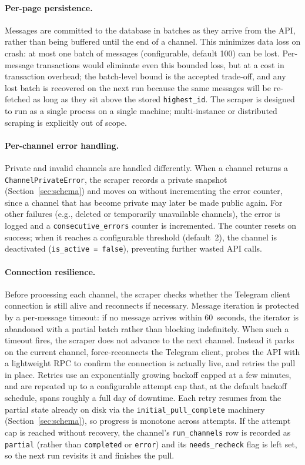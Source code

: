 \paragraph{Per-page persistence.}
Messages are committed to the database in batches as they arrive from the API, rather than being buffered until the end of a channel.
This minimizes data loss on crash: at most one batch of messages (configurable, default 100) can be lost. Per-message transactions would eliminate even this bounded loss, but at a cost in transaction overhead; the batch-level bound is the accepted trade-off, and any lost batch is recovered on the next run because the same messages will be re-fetched as long as they sit above the stored \texttt{highest\_id}. The scraper is designed to run as a single process on a single machine; multi-instance or distributed scraping is explicitly out of scope.

\paragraph{Per-channel error handling.}
Private and invalid channels are handled differently.
When a channel returns a \texttt{ChannelPrivateError}, the scraper records a private snapshot (Section~\ref{sec:schema}) and moves on without incrementing the error counter, since a channel that has become private may later be made public again.
For other failures (e.g., deleted or temporarily unavailable channels), the error is logged and a \texttt{consecutive\_errors} counter is incremented.
The counter resets on success; when it reaches a configurable threshold (default~2), the channel is deactivated (\texttt{is\_active = false}), preventing further wasted API calls.

\paragraph{Connection resilience.}
Before processing each channel, the scraper checks whether the Telegram client connection is still alive and reconnects if necessary.
Message iteration is protected by a per-message timeout: if no message arrives within 60~seconds, the iterator is abandoned with a partial batch rather than blocking indefinitely.
When such a timeout fires, the scraper does not advance to the next channel. Instead it parks on the current channel, force-reconnects the Telegram client, probes the API with a lightweight RPC to confirm the connection is actually live, and retries the pull in place. Retries use an exponentially growing backoff capped at a few minutes, and are repeated up to a configurable attempt cap that, at the default backoff schedule, spans roughly a full day of downtime. Each retry resumes from the partial state already on disk via the \texttt{initial\_pull\_complete} machinery (Section~\ref{sec:schema}), so progress is monotone across attempts. If the attempt cap is reached without recovery, the channel's \texttt{run\_channels} row is recorded as \texttt{partial} (rather than \texttt{completed} or \texttt{error}) and its \texttt{needs\_recheck} flag is left set, so the next run revisits it and finishes the pull.

